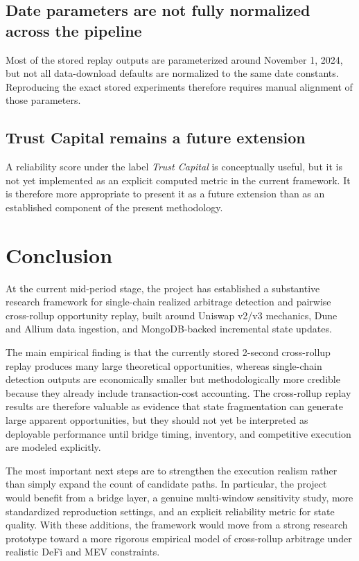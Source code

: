 \documentclass[11pt]{article}
\begin{document}
\subsection{Date parameters are not fully normalized across the pipeline}

Most of the stored replay outputs are parameterized around November 1, 2024, but not all data-download defaults are normalized to the same date constants. Reproducing the exact stored experiments therefore requires manual alignment of those parameters.

\subsection{Trust Capital remains a future extension}

A reliability score under the label \emph{Trust Capital} is conceptually useful, but it is not yet implemented as an explicit computed metric in the current framework. It is therefore more appropriate to present it as a future extension than as an established component of the present methodology.

\section{Conclusion}

At the current mid-period stage, the project has established a substantive research framework for single-chain realized arbitrage detection and pairwise cross-rollup opportunity replay, built around Uniswap v2/v3 mechanics, Dune and Allium data ingestion, and MongoDB-backed incremental state updates.

The main empirical finding is that the currently stored 2-second cross-rollup replay produces many large theoretical opportunities, whereas single-chain detection outputs are economically smaller but methodologically more credible because they already include transaction-cost accounting. The cross-rollup replay results are therefore valuable as evidence that state fragmentation can generate large apparent opportunities, but they should not yet be interpreted as deployable performance until bridge timing, inventory, and competitive execution are modeled explicitly.

The most important next steps are to strengthen the execution realism rather than simply expand the count of candidate paths. In particular, the project would benefit from a bridge layer, a genuine multi-window sensitivity study, more standardized reproduction settings, and an explicit reliability metric for state quality. With these additions, the framework would move from a strong research prototype toward a more rigorous empirical model of cross-rollup arbitrage under realistic DeFi and MEV constraints.
\end{document}
